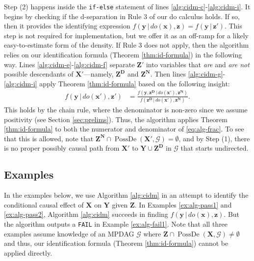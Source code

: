 \documentclass[11pt]{article}
\DeclareMathOperator{\PossDe}{PossDe}
\newcommand{\mb}[1]{\mathbf{#1}}
\newcommand{\g}[1][G]{\mathcal{#1}}
\begin{document}
Step (2) happens inside the \texttt{if-else} statement of lines \ref{alg:cidm-c}-\ref{alg:cidm-i}. It begins by checking if the d-separation in Rule 3 of our do calculus holds. If so, then it provides the identifying expression $f(\mb{y} \,|\, do(\mb{x}), \mb{z}) = f(\mb{y} \,|\, \mb{z'})$. This step is not required for implementation, but we offer it as an off-ramp for a likely easy-to-estimate form of the density. If Rule 3 does not apply, then the algorithm relies on our identification formula (Theorem \ref{thm:id-formula}) in the following way. Lines \ref{alg:cidm-e}-\ref{alg:cidm-f} separate $\mb{Z'}$ into variables that \textit{are} and \textit{are not} possible descendants of $\mb{X'}$---namely, $\mb{Z^D}$ and $\mb{Z^N}$. Then lines \ref{alg:cidm-g}-\ref{alg:cidm-i} apply Theorem \ref{thm:id-formula} based on the following insight:
\begin{align}
    f(\mb{y} \,|\, do(\mb{x'}), \mb{z'}) &= \frac{f(\mb{y}, \mb{z^{\scriptscriptstyle{D}}} \,|\, do(\mb{x'}), \mb{z^{\scriptscriptstyle{N}}} )} {f(\mb{z^{\scriptscriptstyle{D}}} \,|\, do(\mb{x'}), \mb{z^{\scriptscriptstyle{N}}} )}. \label{eq:alg-frac}
\end{align}
This holds by the chain rule, where the denominator is non-zero since we assume positivity (see Section \ref{sec:prelims}). Thus, the algorithm applies Theorem \ref{thm:id-formula} to both the numerator and denominator of \eqref{eq:alg-frac}. To see that this is allowed, note that $\mb{Z^N} \cap \PossDe(\mb{X'}, \g) = \emptyset$, and by Step (1), there is no proper possibly causal path from $\mb{X'}$ to $\mb{Y} \cup \mb{Z^D}$ in $\g$ that starts undirected.







\subsection{Examples}
\label{sec:alg-examples}

In the examples below, we use Algorithm \ref{alg:cidm} in an attempt to identify the conditional causal effect of $\mb{X}$ on $\mb{Y}$ given $\mb{Z}$. In Examples \ref{ex:alg-pass1} and \ref{ex:alg-pass2}, Algorithm \ref{alg:cidm} succeeds in finding $f(\mb{y} \,|\, do (\mb{x}), \mb{z})$. But the algorithm outputs a \texttt{FAIL} in Example \ref{ex:alg-fail1}. Note that all three examples assume knowledge of an MPDAG $\g$ where $\mb{Z} \cap \PossDe(\mb{X}, \g) \neq \emptyset$ and thus, our identification formula (Theorem \ref{thm:id-formula}) cannot be applied directly.
\end{document}
